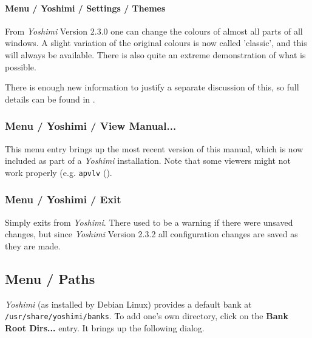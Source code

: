 \paragraph{Menu / Yoshimi / Settings / Themes}
\label{paragraph:menu_yoshimi_settings_themes}
    From \textsl{Yoshimi} Version 2.3.0 one can change the colours of almost
    all parts of all windows. A slight variation of the original colours is now
    called 'classic', and this will always be available. There is also quite an
    extreme demonstration of what is possible.

    There is enough new information to justify a separate discussion of this, so
    full details can be found in \hspace{4pt}.

\subsubsection{Menu / Yoshimi / View Manual...}
\label{subsubsec:menu_yoshimi_view_manual}

   This menu entry brings up the most recent version of this manual, which is
   now included as part of a \textsl{Yoshimi} installation.
   Note that some viewers might not work properly
   (e.g. \texttt{apvlv} (\cite{apvlv}).

\subsubsection{Menu / Yoshimi / Exit}
\label{subsubsec:menu_yoshimi_exit}

   Simply exits from \textsl{Yoshimi}. There used to be a warning if there were
   unsaved changes, but since \textsl{Yoshimi} Version 2.3.2 all configuration
   changes are saved as they are made.
\iffalse
\begin{figure}[H]
   \centering
   \texttt{[image: 2.3.0/settings\_changed.png]}
   \caption[Yoshimi Menu, Exit]{Yoshimi Menu, Exit}
   \label{fig:yoshimi_change_exit}
\end{figure} \fi





\subsection{Menu / Paths}
\label{subsec:menu_paths}

\textsl{Yoshimi} (as installed by Debian Linux) provides a default bank at
   \texttt{/usr/share/yoshimi/banks}.
   To add one's own directory, click on the \textbf{Bank Root Dirs...} entry.
   It brings up the following dialog.

